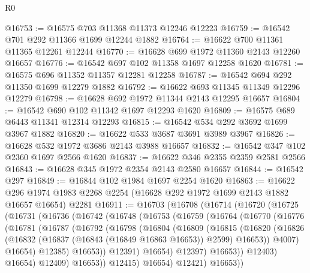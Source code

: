 \begin{lexlean}{R0}
\begin{coremodule}
@16753 := @16575 @703 @11368 @11373 @12246 @12223
@16759 := @16542 @701 @292 @11366 @1699 @12244 @1882
@16764 := @16622 @700 @11361 @11365 @12261 @12244
@16770 := @16628 @699 @1972 @11360 @2143 @12260 @16657
@16776 := @16542 @697 @102 @11358 @1697 @12258 @1620
@16781 := @16575 @696 @11352 @11357 @12281 @12258
@16787 := @16542 @694 @292 @11350 @1699 @12279 @1882
@16792 := @16622 @693 @11345 @11349 @12296 @12279
@16798 := @16628 @692 @1972 @11344 @2143 @12295 @16657
@16804 := @16542 @690 @102 @11342 @1697 @12293 @1620
@16809 := @16575 @689 @6443 @11341 @12314 @12293
@16815 := @16542 @534 @292 @3692 @1699 @3967 @1882
@16820 := @16622 @533 @3687 @3691 @3989 @3967
@16826 := @16628 @532 @1972 @3686 @2143 @3988 @16657
@16832 := @16542 @347 @102 @2360 @1697 @2566 @1620
@16837 := @16622 @346 @2355 @2359 @2581 @2566
@16843 := @16628 @345 @1972 @2354 @2143 @2580 @16657
@16844 := @16542 @297
@16849 := @16844 @102 @1984 @1697 @2254 @1620
@16863 := @16622
    @296
    @1974
    @1983
    @2268
    @2254
    (@16628 @292 @1972 @1699 @2143 @1882 @16657 @16654)
    @2281
@16911 := @16703
    (@16708
      (@16714
        (@16720
          (@16725
            (@16731
              (@16736
                (@16742
                  (@16748
                    (@16753
                      (@16759
                        (@16764
                          (@16770
                            (@16776
                              (@16781
                                (@16787
                                  (@16792
                                    (@16798
                                      (@16804
                                        (@16809
                                          (@16815
                                            (@16820
                                              (@16826
                                                (@16832
                                                  (@16837 (@16843 (@16849 @16863 @16653)) @2599)
                                                  @16653))
                                              @4007)
                                            @16654)
                                          @12385)
                                        @16653))
                                    @12391)
                                  @16654)
                                @12397)
                              @16653))
                          @12403)
                        @16654)
                      @12409)
                    @16653))
                @12415)
              @16654)
            @12421)
          @16653))

\end{coremodule}
\end{lexlean}
